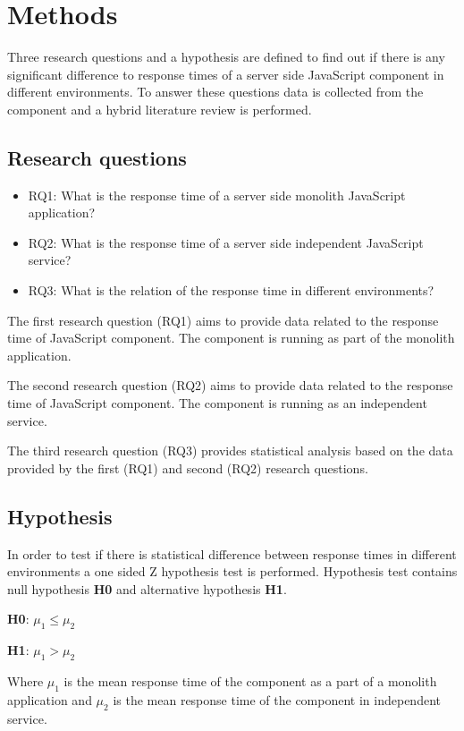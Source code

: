 \chapter{Methods\label{methods}}
Three research questions and a hypothesis are defined to find out if there is any significant difference to response times of a server side JavaScript component in different environments.
To answer these questions data is collected from the component and a hybrid literature review is performed.

\section{Research questions}
\begin{itemize}
    \item RQ1\label{RQ1}: What is the response time of a server side monolith JavaScript application?
    \item RQ2\label{RQ2}: What is the response time of a server side independent JavaScript service?
    \item RQ3\label{RQ3}: What is the relation of the response time in different environments?
\end{itemize}

The first research question (RQ1) aims to provide data related to the response time of JavaScript component. The component is running as part of the monolith application.

The second research question (RQ2) aims to provide data related to the response time of JavaScript component. The component is running as an independent service.

The third research question (RQ3) provides statistical analysis based on the data provided by the first (RQ1) and second (RQ2) research questions.

\section{Hypothesis}
In order to test if there is statistical difference between response times in different environments a one sided Z hypothesis test is performed.
Hypothesis test contains null hypothesis \textbf{H0} and alternative hypothesis \textbf{H1}.

\textbf{H0}\label{H0}: $\mu_1\le\mu_2$

\textbf{H1}\label{H1}: $\mu_1>\mu_2$

Where $\mu_1$ is the mean response time of the component as a part of a monolith application and $\mu_2$ is the mean response time of the component in independent service.

